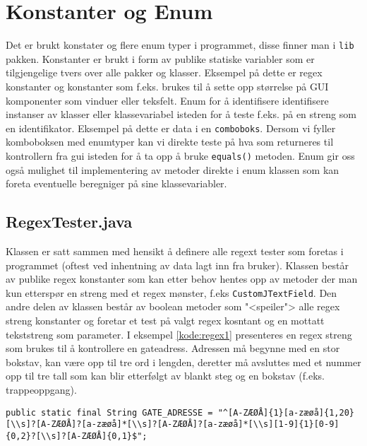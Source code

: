 \section{Konstanter og Enum}
Det er brukt konstater og flere enum typer i programmet, disse finner man i \texttt{lib} pakken. Konstanter er brukt i form av publike statiske variabler som er tilgjengelige tvers over alle pakker og klasser. Eksempel på dette er regex konstanter og konstanter som f.eks. brukes til å sette opp størrelse på GUI komponenter som vinduer eller teksfelt. 
Enum for å identifisere identifisere instanser av klasser eller klassevariabel isteden for å teste f.eks. på en streng som en identifikator. Eksempel på dette er data i en \texttt{comboboks}. Dersom vi fyller komboboksen med enumtyper kan vi direkte teste på hva som returneres til kontrollern fra gui isteden for å ta opp å bruke \texttt{equals()} metoden. 
Enum gir oss også mulighet til implementering av metoder direkte i enum klassen som kan foreta eventuelle beregniger på sine klassevariabler. 

\subsection{RegexTester.java} \label{subsec:regextest}
Klassen er satt sammen med hensikt å definere alle regext tester som foretas i programmet (oftest ved inhentning av data lagt inn fra bruker). 
Klassen består av publike regex konstanter som kan etter behov hentes opp av metoder der man kun etterspør en streng med et regex mønster, f.eks \texttt{CustomJTextField}.
Den andre delen av klassen består av boolean metoder som "<speiler"> alle regex streng konstanter og foretar et test på valgt regex kosntant og en mottatt tekststreng som parameter. 
I eksempel \ref{kode:regex1} presenteres en regex streng som brukes til å kontrollere en gateadress. Adressen må begynne med en stor bokstav, kan være opp til tre ord i lengden, deretter må avsluttes med et nummer opp til tre tall som kan blir etterfølgt av blankt steg og en bokstav (f.eks. trappeoppgang).

\begin{lstlisting}[caption=Regexstreng for gateadresse og husnummer.,label=kode:regex1]
	public static final String GATE_ADRESSE = "^[A-ZÆØÅ]{1}[a-zæøå]{1,20}[\\s]?[A-ZÆØÅ]?[a-zæøå]*[\\s]?[A-ZÆØÅ]?[a-zæøå]*[\\s][1-9]{1}[0-9]{0,2}?[\\s]?[A-ZÆØÅ]{0,1}$";
\end{lstlisting}

